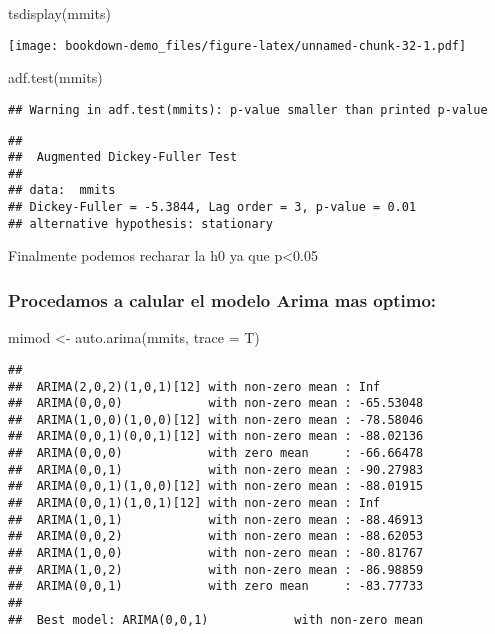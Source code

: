 \documentclass[
]{book}
\newenvironment{Shaded}{\begin{snugshade}}{\end{snugshade}}
\newcommand{\AttributeTok}[1]{\textcolor[rgb]{0.77,0.63,0.00}{#1}}
\newcommand{\FunctionTok}[1]{\textcolor[rgb]{0.00,0.00,0.00}{#1}}
\newcommand{\NormalTok}[1]{#1}
\newcommand{\OtherTok}[1]{\textcolor[rgb]{0.56,0.35,0.01}{#1}}
\begin{document}
\begin{Shaded}
\begin{Highlighting}[]
\FunctionTok{tsdisplay}\NormalTok{(mmits)}
\end{Highlighting}
\end{Shaded}

\texttt{[image: bookdown-demo\_files/figure-latex/unnamed-chunk-32-1.pdf]}

\begin{Shaded}
\begin{Highlighting}[]
\FunctionTok{adf.test}\NormalTok{(mmits)}
\end{Highlighting}
\end{Shaded}

\begin{verbatim}
## Warning in adf.test(mmits): p-value smaller than printed p-value
\end{verbatim}

\begin{verbatim}
## 
##  Augmented Dickey-Fuller Test
## 
## data:  mmits
## Dickey-Fuller = -5.3844, Lag order = 3, p-value = 0.01
## alternative hypothesis: stationary
\end{verbatim}

Finalmente podemos recharar la h0 ya que p\textless0.05

\hypertarget{procedamos-a-calular-el-modelo-arima-mas-optimo}{%
\subsubsection{Procedamos a calular el modelo Arima mas optimo:}\label{procedamos-a-calular-el-modelo-arima-mas-optimo}}

\begin{Shaded}
\begin{Highlighting}[]
\NormalTok{mimod }\OtherTok{\textless{}{-}} \FunctionTok{auto.arima}\NormalTok{(mmits, }\AttributeTok{trace =}\NormalTok{ T)}
\end{Highlighting}
\end{Shaded}

\begin{verbatim}
## 
##  ARIMA(2,0,2)(1,0,1)[12] with non-zero mean : Inf
##  ARIMA(0,0,0)            with non-zero mean : -65.53048
##  ARIMA(1,0,0)(1,0,0)[12] with non-zero mean : -78.58046
##  ARIMA(0,0,1)(0,0,1)[12] with non-zero mean : -88.02136
##  ARIMA(0,0,0)            with zero mean     : -66.66478
##  ARIMA(0,0,1)            with non-zero mean : -90.27983
##  ARIMA(0,0,1)(1,0,0)[12] with non-zero mean : -88.01915
##  ARIMA(0,0,1)(1,0,1)[12] with non-zero mean : Inf
##  ARIMA(1,0,1)            with non-zero mean : -88.46913
##  ARIMA(0,0,2)            with non-zero mean : -88.62053
##  ARIMA(1,0,0)            with non-zero mean : -80.81767
##  ARIMA(1,0,2)            with non-zero mean : -86.98859
##  ARIMA(0,0,1)            with zero mean     : -83.77733
## 
##  Best model: ARIMA(0,0,1)            with non-zero mean
\end{verbatim}
\end{document}
